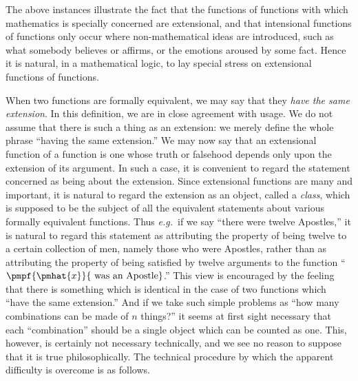 \documentclass[letterpaper,12pt,openany,leqno]{book}
\newcommand{\pagefirst}[1]{\marginnote[\boxed{\text{#1}}]{\boxed{\text{#1}}}}
\begin{document}
The above instances illustrate the fact that the functions of functions with which mathematics is specially concerned are extensional, and that intensional functions of functions only occur where non-mathematical ideas are introduced, such as what somebody believes or affirms, or the emotions aroused by some fact. Hence it is natural, in a mathematical logic, to lay special stress on extensional functions of functions.

When two functions are formally equivalent, we may say that they \textit{have the same extension}. In this definition, we are in close agreement with usage. We do not assume that there is such a thing as an extension: we merely define the whole phrase ``having the same extension.'' We may now say that an extensional function of a function is one whose truth or falsehood depends only upon the extension of its argument. In such a case, it is convenient to regard the statement concerned as being about the extension. Since extensional functions are many and important, it is natural to regard the extension as an object, called a \textit{class}, which is supposed to be the subject of all the equivalent statements about various formally equivalent functions. Thus \textit{e.g.}\ if we say ``there were twelve Apostles,'' it is natural to regard this statement as attributing the property of being twelve to a certain collection of men, namely those who were Apostles, rather than as attributing the property of being satisfied by twelve arguments to the function ``$\pmpf{\pmhat{x}}{\text{ was an Apostle}}$.'' This view is encouraged by the feeling that there is something which is identical in the case of two functions which ``have the same extension.'' And if we take such simple problems as ``how many combinations can be made of $n$ things?'' it seems at first sight necessary that each ``combination'' should be a single object which can be counted as one. This, however, is certainly not necessary technically, and we see no reason to suppose that it is true \pagefirst{78} philosophically. The technical procedure by which the apparent difficulty is overcome is as follows.
\end{document}
